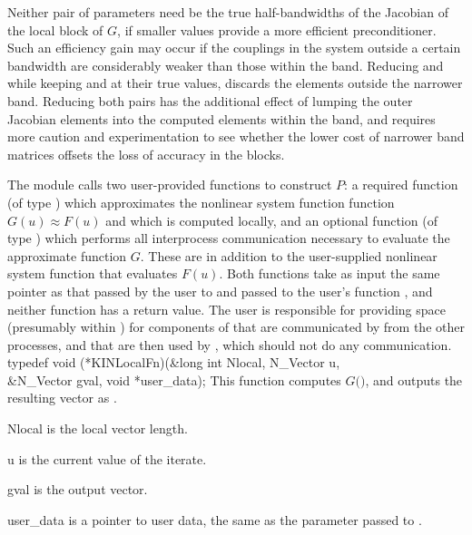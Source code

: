 Neither pair of parameters need be the true half-bandwidths of the Jacobian
of the local block of $G$, if smaller values provide a more efficient
preconditioner.  Such an efficiency gain may occur if the couplings
in the system outside a certain bandwidth are considerably weaker than
those within the band.  Reducing  and  while keeping
 and  at their true values, discards the elements
outside the narrower band.  Reducing both pairs has the additional
effect of lumping the outer Jacobian elements into the computed elements
within the band, and requires more caution and experimentation to see
whether the lower cost of narrower band matrices offsets the loss of
accuracy in the blocks.

The {\kinbbdpre} module calls two user-provided functions to construct $P$: 
a required function  (of type ) which
approximates the nonlinear system function function $G(u) \approx F(u)$ and which 
is computed locally, and an optional function  (of type ) 
which performs all interprocess communication necessary to evaluate 
the approximate function $G$.  
These are in addition to the user-supplied nonlinear system function that 
evaluates $F(u)$.
Both functions take as input the same pointer  as that passed
by the user to  and passed to the user's function ,
and neither function has a return value. The user is responsible for
providing space (presumably within ) for components of 
that are communicated by  from the other processes, and that are
then used by , which should not do any communication.
{
  typedef void (*KINLocalFn)(&long int Nlocal, N\_Vector u, \\
                             &N\_Vector gval, void *user\_data);
}
{
  This  function computes $G($$)$, and outputs the resulting
  vector as .
}
{
  \begin{args}[Nlocal]
  \item[Nlocal] 
    is the local vector length.
  \item[u]
    is the current value of the iterate.
  \item[gval]
    is the output vector.
  \item[user\_data]
    is a pointer to user data, the same as the       
    parameter passed to .  
  \end{args}
}
